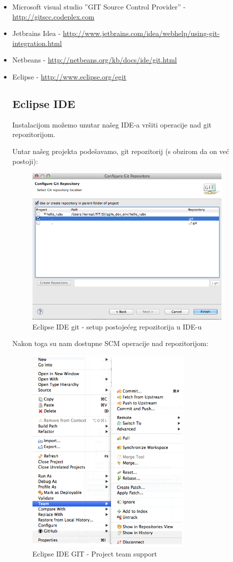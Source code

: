 \documentclass[times, utf8, seminar]{fit}
\begin{document}
\begin{itemize}
  \item Microsoft visual studio ''GIT Source Control Provider'' - \url{http://gitscc.codeplex.com}
  \item Jetbrains Idea - \url{http://www.jetbrains.com/idea/webhelp/using-git-integration.html}
  \item Netbeans - \url{http://netbeans.org/kb/docs/ide/git.html}
  \item Eclipse - \url{http://www.eclipse.org/egit}

\subsection{Eclipse IDE}

Instalacijom \href{http://www.vogella.com/articles/EGit/article.html}{\color{blue}{EGit plugin-a}} možemo unutar našeg IDE-a vršiti operacije nad git repozitorijom.

Untar našeg projekta podešavamo, git repozitorij (s obzirom da on već postoji):
\begin{figure}[H]
\centering
\includegraphics[width=10cm]{img/eclipse_git_01.png}
\caption{Eclipse IDE git - setup postojećeg repozitorija u IDE-u}
\end{figure}

Nakon toga su nam dostupne SCM operacije nad repozitorijom:
\begin{figure}[H]
\centering
\includegraphics[width=8cm]{img/eclipse_git_02.png}
\caption{Eclipse IDE GIT - Project team support}
\end{figure}


\end{itemize}
\end{document}

